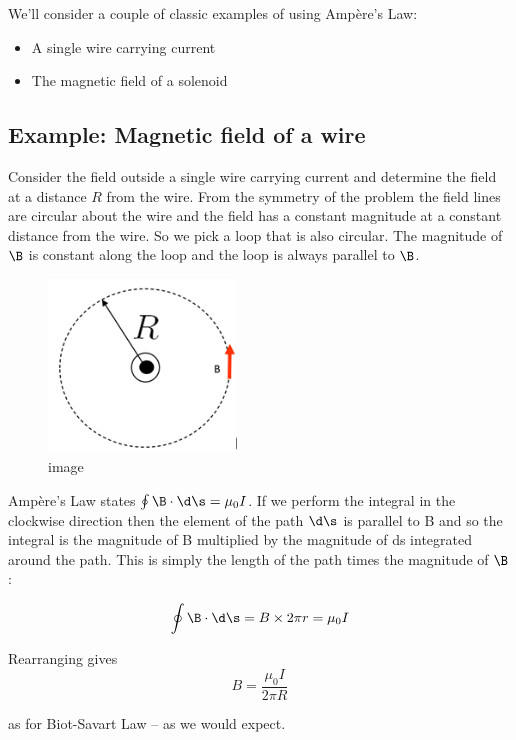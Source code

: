 \documentclass[
]{book}
\begin{document}
We'll consider a couple of classic examples of using Ampère's Law:

\begin{itemize}
\item
  A single wire carrying current
\item
  The magnetic field of a solenoid
\end{itemize}

\hypertarget{example-magnetic-field-of-a-wire}{%
\subsection{Example: Magnetic field of a wire}\label{example-magnetic-field-of-a-wire}}

Consider the field outside a single wire carrying current and determine
the field at a distance \(R\) from the wire. From the symmetry of the
problem the field lines are circular about the wire and the field has a
constant magnitude at a constant distance from the wire. So we pick a
loop that is also circular. The magnitude of \(\B\) is constant along the
loop and the loop is always parallel to \(\B\).

\begin{figure}
\centering
\includegraphics[width=50mm,height=\textheight]{Figures/wireField.png}
\caption{image}
\end{figure}

Ampère's Law states \(\oint \B \cdot \d\s = \mu_0 I\). If we perform the
integral in the clockwise direction then the element of the path \(\d\s\)
is parallel to B and so the integral is the magnitude of B multiplied by
the magnitude of ds integrated around the path. This is simply the
length of the path times the magnitude of \(\B\):

\[\begin{aligned}
\oint \B \cdot \d\s = B \times 2\pi r = \mu_0 I
\end{aligned}\]

Rearranging gives \[B = \frac{\mu_0 I}{2\pi R}\]

as for Biot-Savart Law -- as we would expect.
\end{document}
